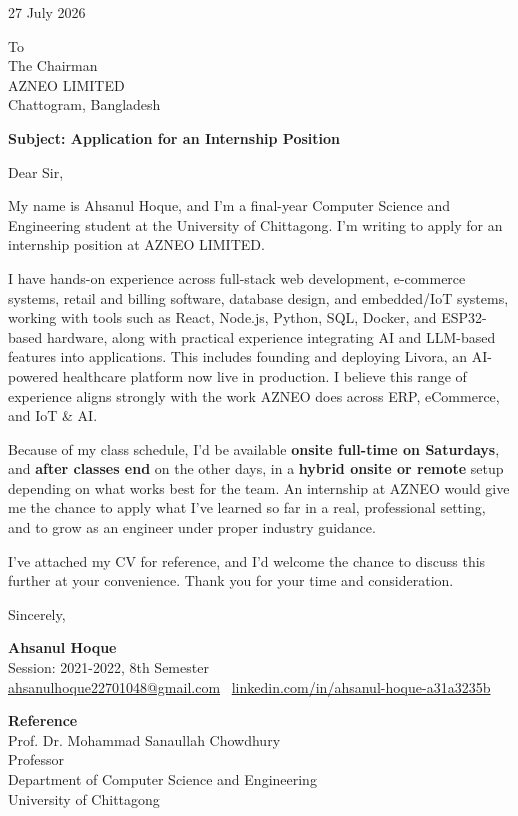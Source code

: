 \documentclass[11pt,a4paper]{letter}
\begin{document}
\begin{flushleft}

27 July 2026

\vspace{14pt}

To\\
The Chairman\\
AZNEO LIMITED\\
Chattogram, Bangladesh

\vspace{14pt}

\textbf{Subject: Application for an Internship Position}

\vspace{10pt}

Dear Sir,

My name is Ahsanul Hoque, and I'm a final-year Computer Science and Engineering student at the University of Chittagong. I'm writing to apply for an internship position at AZNEO LIMITED.

I have hands-on experience across full-stack web development, e-commerce systems, retail and billing software, database design, and embedded/IoT systems, working with tools such as React, Node.js, Python, SQL, Docker, and ESP32-based hardware, along with practical experience integrating AI and LLM-based features into applications. This includes founding and deploying Livora, an AI-powered healthcare platform now live in production. I believe this range of experience aligns strongly with the work AZNEO does across ERP, eCommerce, and IoT \& AI.

Because of my class schedule, I'd be available \textbf{onsite full-time on Saturdays}, and \textbf{after classes end} on the other days, in a \textbf{hybrid onsite or remote} setup depending on what works best for the team. An internship at AZNEO would give me the chance to apply what I've learned so far in a real, professional setting, and to grow as an engineer under proper industry guidance.

I've attached my CV for reference, and I'd welcome the chance to discuss this further at your convenience. Thank you for your time and consideration.

\vspace{20pt}

Sincerely,

\vspace{28pt}

\textbf{Ahsanul Hoque}\\
Session: 2021-2022, 8th Semester\\
\href{mailto:ahsanulhoque22701048@gmail.com}{ahsanulhoque22701048@gmail.com} \textbar\ \href{https://linkedin.com/in/ahsanul-hoque-a31a3235b}{linkedin.com/in/ahsanul-hoque-a31a3235b}

\vspace{60pt}

\textbf{Reference}\\
Prof. Dr. Mohammad Sanaullah Chowdhury\\
Professor\\
Department of Computer Science and Engineering\\
University of Chittagong

\end{flushleft}
\end{document}

